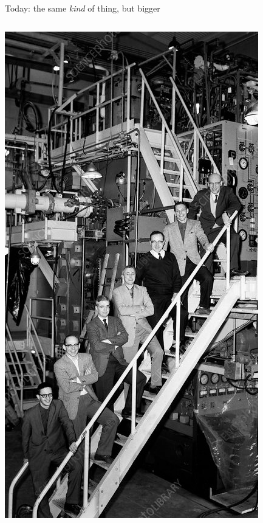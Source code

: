 \documentclass[aspectratio=169]{beamer}
\begin{document}
\begin{frame}{Today: the same {\it kind} of thing, but bigger}
\vspace{0.15 cm}
\begin{columns}
\includegraphics[width=\linewidth]{img/H4000010-Team_that_discovered_Omega_minus_particle.jpg}


\end{columns}
\end{frame}
\end{document}
